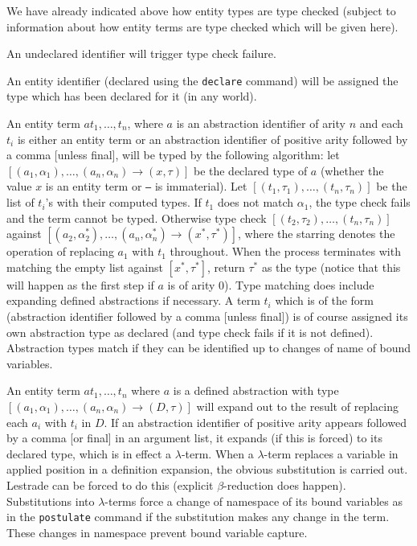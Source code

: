 We have already indicated above how entity types are type checked (subject to information about how entity terms are type checked which will be given here).

An undeclared identifier will trigger type check failure.

An entity identifier (declared using the {\tt declare} command) will be assigned the type which has been declared for it (in any world). 

An entity term $a t_1,\ldots, t_n$, where $a$ is an abstraction identifier of arity $n$ and each $t_i$ is either an entity term or an abstraction identifier of positive arity followed by a comma [unless final],
will be typed by the following algorithm:  let $[(a_1,\alpha_1),\ldots,(a_n,\alpha_n)\rightarrow (x,\tau)]$ be the declared type of $a$ (whether the value $x$ is an entity term or {\tt ---} is immaterial).
Let $[(t_1,\tau_1),\ldots,(t_n,\tau_n)]$ be the list of $t_i$'s with their computed types.   If $t_1$ does not match $\alpha_1$, the type check fails and the term cannot be typed.   Otherwise type check $[(t_2,\tau_2),\ldots,(t_n,\tau_n)]$ against $[(a_2,\alpha_2^*),\ldots,(a_n,\alpha_n^*)\rightarrow (x^*,\tau^*)]$, where the starring denotes the operation of replacing $a_1$ with $t_1$ throughout.  When the process terminates with matching the empty list against $[x^*,\tau^*]$, return $\tau^*$ as the type (notice that this will happen as the first step if $a$ is of arity 0).  Type matching does include expanding defined abstractions if necessary.  A term $t_i$ which is of the form (abstraction identifier followed by a comma [unless final]) is of course assigned its own abstraction type as declared (and type check fails if it is not defined).  Abstraction types match if they can be identified up to changes of name of bound variables.

An entity term $a t_1,\ldots, t_n$ where $a$ is a defined abstraction with type $[(a_1,\alpha_1),\ldots,(a_n,\alpha_n)\rightarrow (D,\tau)]$  will expand out to the result of replacing
each $a_i$ with $t_i$ in $D$.  If an abstraction identifier of positive arity appears followed by a comma [or final] in an argument list, it expands (if this is forced) to its declared type, which is in effect a $\lambda$-term.
When a $\lambda$-term replaces a variable in applied position in a definition expansion, the obvious substitution is carried out.  Lestrade can be forced to do this (explicit $\beta$-reduction does happen).   Substitutions into $\lambda$-terms force a change of namespace of its bound variables as in the {\tt postulate} command if the substitution makes any change in the term.   These changes in namespace prevent bound variable capture.

